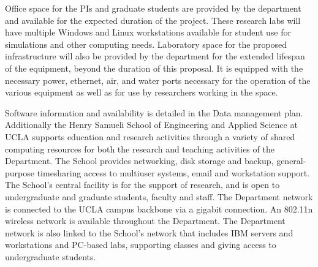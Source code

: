 
Office space for the PIs and graduate students are provided by the department and available for the expected duration of the project.  These research labs will have multiple Windows and Linux workstations available for student use for simulations and other computing needs.  Laboratory space for the proposed infrastructure will also be provided by the department for the extended lifespan of the equipment, beyond the duration of this proposal.  It is equipped with the necessary power, ethernet, air, and water ports necessary for the operation of the various equipment as well as for use by researchers working in the space.
 
 Software information and availability is detailed in the Data management plan. Additionally the Henry Samueli School of Engineering and Applied Science at UCLA supports education and research activities through a variety of shared computing resources for both the research and teaching activities of the Department. The School provides networking, disk storage and backup, general-purpose timesharing access to multiuser systems, email and workstation support. The School's central facility is for the support of research, and is open to undergraduate and graduate students, faculty and staff. The Department network is connected to the UCLA campus backbone via a gigabit connection. An 802.11n wireless network is available throughout the Department. The Department network is also linked to the School's network that includes IBM servers and workstations and PC-based labs, supporting classes and giving access to undergraduate students.

